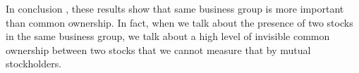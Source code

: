 					
					
					
					In conclusion , these results show that same business group is more important than common ownership. In fact, when we talk about the presence of two stocks in the same business group, we talk about a high level of invisible common ownership between two stocks that we cannot measure that by mutual stockholders.
					
					
					\FloatBarrier
